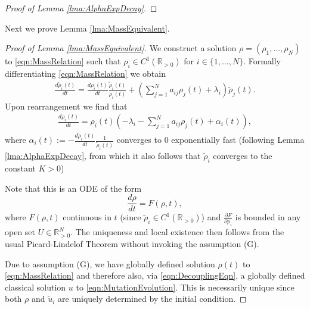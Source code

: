 \documentclass{article}
\begin{document}
\begin{proof}[Proof of Lemma \ref{lma:AlphaExpDecay}]
    
\end{proof}
Next we prove Lemma \ref{lma:MassEquivalent}.
\begin{proof}[Proof of Lemma \ref{lma:MassEquivalent}]

We construct a solution $\rho=(\rho_1,...,\rho_N)$ to \eqref{eqn:MassRelation} such that $\rho_i\in{}C^1(\mathbb{R}_{>0})$ for $i\in\{1,...,N\}$. Formally differentiating \eqref{eqn:MassRelation} we obtain
    \begin{align*}
        \frac{d\tilde{\rho}_i(t)}{dt}=\frac{d\rho_i(t)}{dt}\frac{\tilde{\rho}_i(t)}{\rho_i(t)}+\left(\sum_{j=1}^Na_{ij}\rho_j(t)+\lambda_i\right)\tilde{\rho}_j(t).
    \end{align*}
    Upon rearrangement we find that
        \begin{align*}
        \frac{d\rho_i(t)}{dt}=\rho_i(t)\left(-\lambda_i-\sum_{j=1}^Na_{ij}\rho_j(t)+\alpha_i(t)\right),
    \end{align*} 
    where $\alpha_i(t):=-\frac{d\tilde{\rho}_i(t)}{dt}\frac{1}{\tilde{\rho}_i(t)}$ converges to $0$ exponentially fast (following Lemma \ref{lma:AlphaExpDecay}, {from which it also follows that $\tilde{\rho}_i$ converges to the constant $K>0$}) 
    
     

    Note that
    this is an ODE of the form
    \[\frac{d\rho}{dt}=F(\rho,t),\]
where $F(\rho,t)$ continuous in $t$ (since $\tilde{\rho}_i\in{}C^1(\mathbb{R}_{>0})$) and $\frac{\partial{F}}{\partial{\rho_i}}$ is bounded in any open set $U\in{}\mathbb{R}^N_{>0}$.  The uniqueness and local existence then follows from the usual Picard-Lindelof Theorem without invoking the assumption (G). 


Due to assumption (G), we have globally defined solution $\rho(t)$ to \eqref{eqn:MassRelation} and therefore also, via \eqref{eqn:DecouplingEqn}, a globally defined classical solution $u$ to \eqref{eqn:MutationEvolution}. This is necessarily unique since both $\rho$ and $\tilde{u}_i$ are uniquely determined by the initial condition.




\end{proof}
\end{document}
